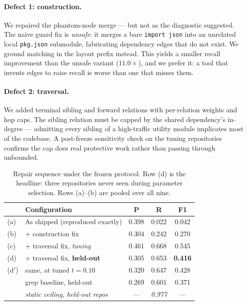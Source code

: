 \documentclass[sigconf,review,anonymous]{acmart}
\begin{document}
\paragraph{Defect 1: construction.} We repaired the phantom-node merge --- but not as the diagnostic
suggested. The naive guard fix is \emph{unsafe}: it merges a bare \texttt{import json} into an
unrelated local \texttt{pkg.json} submodule, fabricating dependency edges that do not exist. We ground
matching in the layout prefix instead. This yields a smaller recall improvement than the unsafe
variant ($11.0\times$), and we prefer it: a tool that invents edges to raise recall is worse than one
that misses them.

\paragraph{Defect 2: traversal.} We added terminal sibling and forward relations with per-relation
weights and hop caps. The sibling relation must be capped by the shared dependency's in-degree ---
admitting every sibling of a high-traffic utility module implicates most of the codebase. A
post-freeze sensitivity check on the tuning repositories confirms the cap does real protective work
rather than passing through unbounded.

\begin{table}[t]
\caption{Repair sequence under the frozen protocol. Row (d) is the headline: three repositories never
seen during parameter selection. Rows (a)--(b) are pooled over all nine.}
\label{tab:repair}
\small
\begin{tabular}{llccc}
\toprule
& Configuration & P & R & F1 \\
\midrule
(a) & As shipped (reproduced exactly) & 0.398 & 0.022 & 0.042 \\
(b) & \quad + construction fix & 0.304 & 0.242 & 0.270 \\
(c) & \quad + traversal fix, \emph{tuning} & 0.461 & 0.668 & 0.545 \\
(d) & \quad + traversal fix, \textbf{held-out} & 0.305 & 0.653 & \textbf{0.416} \\
(d$'$) & \quad\quad same, at tuned $t{=}0.10$ & 0.320 & 0.647 & 0.428 \\
\midrule
& grep baseline, held-out & 0.269 & 0.601 & 0.371 \\
& \emph{static ceiling, held-out repos} & --- & \emph{0.977} & --- \\
\bottomrule
\end{tabular}
\end{table}
\end{document}
